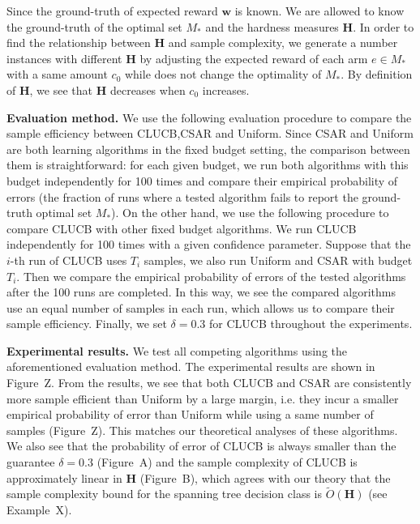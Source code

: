\documentclass{article}
\newcommand{\Algorithm}{{\small \textsf{CLUCB}}\xspace}
\newcommand{\AlgorithmBud}{{\small \textsf{CSAR}}\xspace}
\newcommand{\Uniform}{{\small \textsf{Uniform}}\xspace}
\renewcommand{\vec}[1]{\boldsymbol{#1}}
\begin{document}
Since the ground-truth of expected reward $\vec w$ is known.
We are allowed to know the ground-truth of the optimal set $M_*$ and the hardness measures $\mathbf H$.
In order to find the relationship between $\mathbf H$ and sample complexity, we generate a number instances with different $\mathbf H$ by adjusting the expected reward of each arm $e\in M_*$ with a same amount $c_0$ while does not change the optimality of $M_*$.
By definition of $\mathbf H$, we see that $\mathbf H$ decreases when $c_0$ increases.


\textbf{Evaluation method.} 
We use the following evaluation procedure to compare the sample efficiency between \Algorithm,\AlgorithmBud and \Uniform.
Since \AlgorithmBud and \Uniform are both learning algorithms in the fixed budget setting, the comparison between them is straightforward:
for each given budget, we run both algorithms with this budget independently for 100 times and compare their empirical probability of errors (the fraction of runs where a tested algorithm fails to report the ground-truth optimal set $M_*$).
On the other hand, we use the following procedure to compare \Algorithm with other fixed budget algorithms.
We run \Algorithm independently for 100 times with a given confidence parameter.
Suppose that the $i$-th run of \Algorithm uses $T_i$ samples, we also run \Uniform and \AlgorithmBud with budget $T_i$.
Then we compare the empirical probability of errors of the tested algorithms after the 100 runs are completed.
In this way, we see the compared algorithms use an equal number of samples in each run, which allows us to compare their sample efficiency.
Finally, we set $\delta=0.3$ for \Algorithm throughout the experiments.


\textbf{Experimental results.}
We test all competing algorithms using the aforementioned evaluation method.
The experimental results are shown in Figure~Z.
From the results, we see that both \Algorithm and \AlgorithmBud are consistently more sample efficient than \Uniform by a large margin, i.e. they incur a smaller empirical probability of error than \Uniform while using a same number of samples (Figure~Z).
This matches our theoretical analyses of these algorithms.
We also see that the probability of error of \Algorithm is always smaller than the guarantee $\delta=0.3$ (Figure~A) and the sample complexity of \Algorithm is approximately linear in $\mathbf H$ (Figure~B), which agrees with our theory that the sample complexity bound for the spanning tree decision class is $\tilde O(\mathbf H)$ (see Example~X).
\end{document}
